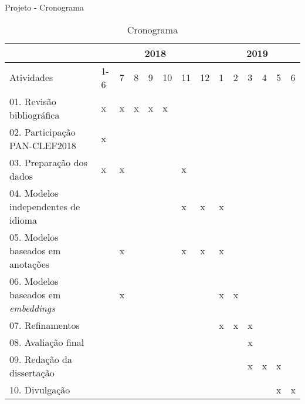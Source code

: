 \begin{frame}{Projeto - Cronograma}


\setlength{\tabcolsep}{4pt}\selectFont
\begin{table}[]
	\centering
	\caption{Cronograma}
		\begin{tabular}{|l|l|l|l|l|l|l|l|l|l|l|l|l|l|}
			\toprule
			                                         & \multicolumn{7}{c|}{2018}      & \multicolumn{6}{c|}{2019} \\ \midrule
			Atividades                               & 1-6 & 7 & 8 & 9 & 10 & 11 & 12 & 1 & 2 & 3 & 4 & 5 & 6     \\ \hline
			01. Revisão bibliográfica                & x   & x & x & x & x  &    &    &   &   &   &   &   &       \\ \hline
			02. Participação PAN-CLEF2018            & x   &   &   &   &    &    &    &   &   &   &   &   &       \\ \hline
			03. Preparação dos dados                 & x   & x &   &   &    & x  &    &   &   &   &   &   &       \\ \hline
			04. Modelos independentes de idioma      &     &   &   &   &    & x  & x  & x &   &   &   &   &       \\ \hline
			05. Modelos baseados em anotações        &     & x &   &   &    & x  & x  & x &   &   &   &   &       \\ \hline
			06. Modelos baseados em {\it embeddings} &     & x &   &   &    &    &    & x & x &   &   &   &       \\ \hline
			07. Refinamentos                         &     &   &   &   &    &    &    & x & x & x &   &   &       \\ \hline
			08. Avaliação final                      &     &   &   &   &    &    &    &   &   & x &   &   &       \\ \hline
			09. Redação da dissertação               &     &   &   &   &    &    &    &   &   & x & x & x &       \\ \hline
			10. Divulgação                           &     &   &   &   &    &    &    &   &   &   &   & x & x     \\ \bottomrule
		\end{tabular}
	\end{table}
\end{frame}


